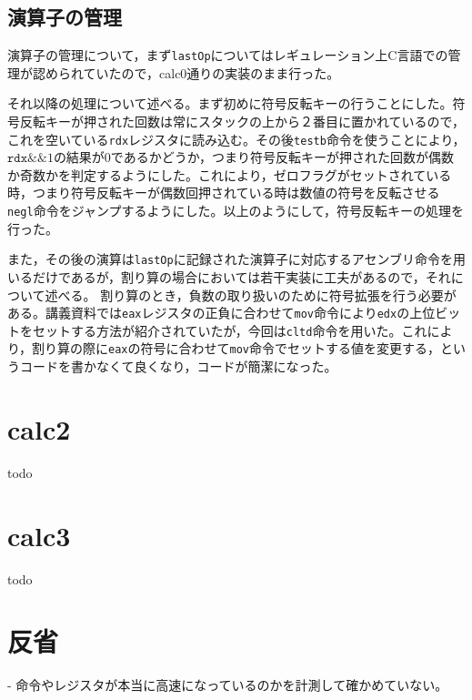 \documentclass[a4paper]{jsarticle}
\newcommand{\var}[1]{\texttt{#1}}
\begin{document}
\subsection{演算子の管理}
演算子の管理について，まず\var{lastOp}についてはレギュレーション上C言語での管理が認められていたので，calc0通りの実装のまま行った。

それ以降の処理について述べる。まず初めに符号反転キーの行うことにした。符号反転キーが押された回数は常にスタックの上から２番目に置かれているので，これを空いている\var{rdx}レジスタに読み込む。その後\var{testb}命令を使うことにより，$\var{rdx} \&\& 1$の結果が0であるかどうか，つまり符号反転キーが押された回数が偶数か奇数かを判定するようにした。これにより，ゼロフラグがセットされている時，つまり符号反転キーが偶数回押されている時は数値の符号を反転させる\var{negl}命令をジャンプするようにした。以上のようにして，符号反転キーの処理を行った。

また，その後の演算は\var{lastOp}に記録された演算子に対応するアセンブリ命令を用いるだけであるが，割り算の場合においては若干実装に工夫があるので，それについて述べる。
割り算のとき，負数の取り扱いのために符号拡張を行う必要がある。講義資料では\var{eax}レジスタの正負に合わせて\var{mov}命令により\var{edx}の上位ビットをセットする方法が紹介されていたが，今回は\var{cltd}命令を用いた。これにより，割り算の際に\var{eax}の符号に合わせて\var{mov}命令でセットする値を変更する，というコードを書かなくて良くなり，コードが簡潔になった。







\section{calc2}
todo
\section{calc3}
todo
\section{反省}
- 命令やレジスタが本当に高速になっているのかを計測して確かめていない。
\end{document}
